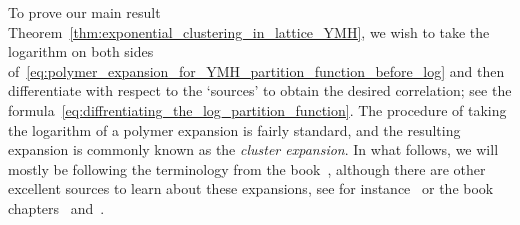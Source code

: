 \documentclass[11pt]{article}
\theoremstyle{definition}
\theoremstyle{remark}
\numberwithin{theorem}{section}
\begin{document}
    To prove our main result Theorem~\ref{thm:exponential_clustering_in_lattice_YMH}, we wish to take the logarithm on both sides of~\eqref{eq:polymer_expansion_for_YMH_partition_function_before_log} and then differentiate with respect to the `sources' to obtain the desired correlation; see the formula~\eqref{eq:diffrentiating_the_log_partition_function}. The procedure of taking the logarithm of a polymer expansion is fairly standard, and the resulting expansion is commonly known as the \emph{cluster expansion}. In what follows, we will mostly be following the terminology from the book~\cite[Chapter~5]{Friedli-Velenik_book}, although there are other excellent sources to learn about these expansions, see for instance~\cite{Cammarota, Kotecky-Preiss} or the book chapters~\cite[Chapter~3]{Seiler-book}  and~\cite[Chapter~V]{Simon-book}. 
\end{document}
